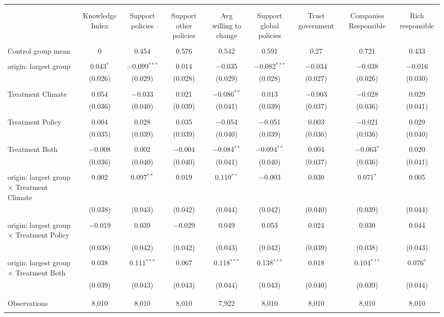 
\begin{tabular}{@{\extracolsep{5pt}}lcccccccc} 
\\[-1.8ex]\hline 
\hline \\[-1.8ex] 
\\[-1.8ex] & Knowledge Index & Support policies & Support other policies & Avg willing to change & Support global policies & Trust government & Companies Responsible & Rich responsible \\ 
\hline \\[-1.8ex] 
 Control group mean & 0 & 0.454 & 0.576 & 0.542 & 0.591 & 0.27 & 0.721 & 0.433  \\ \hline \\[-1.8ex] origin: largest group & 0.043$^{*}$ & $-$0.099$^{***}$ & 0.014 & $-$0.035 & $-$0.082$^{***}$ & $-$0.034 & $-$0.038 & $-$0.016 \\ 
  & (0.026) & (0.029) & (0.028) & (0.029) & (0.028) & (0.027) & (0.026) & (0.030) \\ 
  & & & & & & & & \\ 
 Treatment Climate & 0.054 & $-$0.033 & 0.021 & $-$0.086$^{**}$ & 0.013 & $-$0.003 & $-$0.028 & 0.029 \\ 
  & (0.036) & (0.040) & (0.039) & (0.041) & (0.039) & (0.037) & (0.036) & (0.041) \\ 
  & & & & & & & & \\ 
 Treatment Policy & 0.004 & 0.028 & 0.035 & $-$0.054 & $-$0.051 & 0.003 & $-$0.021 & 0.029 \\ 
  & (0.035) & (0.039) & (0.039) & (0.040) & (0.039) & (0.036) & (0.036) & (0.040) \\ 
  & & & & & & & & \\ 
 Treatment Both & $-$0.008 & 0.002 & $-$0.004 & $-$0.084$^{**}$ & $-$0.094$^{**}$ & 0.004 & $-$0.063$^{*}$ & 0.020 \\ 
  & (0.036) & (0.040) & (0.040) & (0.041) & (0.040) & (0.037) & (0.036) & (0.041) \\ 
  & & & & & & & & \\ 
 origin: largest group $\times$ Treatment Climate & 0.002 & 0.097$^{**}$ & 0.019 & 0.110$^{**}$ & $-$0.003 & 0.030 & 0.071$^{*}$ & 0.005 \\ 
  & (0.038) & (0.043) & (0.042) & (0.044) & (0.042) & (0.040) & (0.039) & (0.044) \\ 
  & & & & & & & & \\ 
 origin: largest group $\times$ Treatment Policy & $-$0.019 & 0.039 & $-$0.029 & 0.049 & 0.053 & 0.024 & 0.030 & 0.044 \\ 
  & (0.038) & (0.042) & (0.042) & (0.043) & (0.042) & (0.039) & (0.038) & (0.043) \\ 
  & & & & & & & & \\ 
 origin: largest group $\times$ Treatment Both & 0.038 & 0.111$^{***}$ & 0.067 & 0.118$^{***}$ & 0.138$^{***}$ & 0.018 & 0.104$^{***}$ & 0.076$^{*}$ \\ 
  & (0.039) & (0.043) & (0.043) & (0.044) & (0.043) & (0.040) & (0.039) & (0.044) \\ 
  & & & & & & & & \\ 
\hline \\[-1.8ex] 

Observations & 8,010 & 8,010 & 8,010 & 7,922 & 8,010 & 8,010 & 8,010 & 8,010 \\ 
\hline 
\hline \\[-1.8ex] 
\end{tabular} 